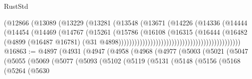 \begin{lexlean}{RustStd}
\begin{coremodule}
                                                        (@12866
                                                          (@13089
                                                            (@13229
                                                              (@13281
                                                                (@13548
                                                                  (@13671
                                                                    (@14226
                                                                      (@14336
                                                                        (@14444
                                                                          (@14454
                                                                            (@14469
                                                                              (@14767
                                                                                (@15261
                                                                                  (@15786
                                                                                    (@16108
                                                                                      (@16315
                                                                                        (@16444
                                                                                          (@16482
                                                                                            (@4899
                                                                                              (@16487
                                                                                                @16781)
                                                                                              (@31
                                                                                                @4898))))))))))))))))))))))))))))))))))))))))))))))
@16863 := @4897
    (@4931
      (@4947
        (@4958
          (@4968
            (@4977
              (@5003
                (@5021
                  (@5047
                    (@5055
                      (@5069
                        (@5077
                          (@5093
                            (@5102
                              (@5119
                                (@5131
                                  (@5148
                                    (@5156
                                      (@5168
                                        (@5264
                                          (@5630

\end{coremodule}
\end{lexlean}
